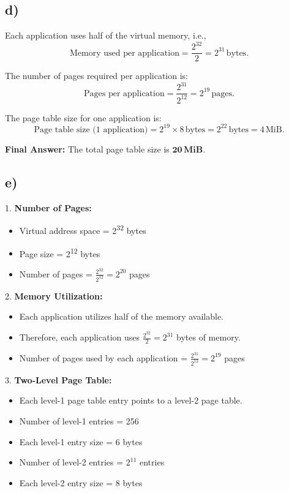 \documentclass[cn,12pt]{homework}
\begin{document}
\begin{solution}
\subsection*{d)}


Each application uses half of the virtual memory, i.e., 
\[
\text{Memory used per application} = \frac{2^{32}}{2} = 2^{31} \, \text{bytes}.
\]

The number of pages required per application is:
\[
\text{Pages per application} = \frac{2^{31}}{2^{12}} = 2^{19} \, \text{pages}.
\]

The page table size for one application is:
\[
\text{Page table size (1 application)} = 2^{19} \times 8 \, \text{bytes} = 2^{22} \, \text{bytes}=4 \, \text{MiB}.
\]

\textbf{Final Answer:} The total page table size is \(\mathbf{20 \, \text{MiB}}\).



\subsection*{e)}

1. \textbf{Number of Pages:}
   \begin{itemize}
     \item Virtual address space = 2\textsuperscript{32} bytes
     \item Page size = 2\textsuperscript{12} bytes
     \item Number of pages = \(\frac{2^{32}}{2^{12}} = 2^{20}\) pages
   \end{itemize}

2. \textbf{Memory Utilization:}
   \begin{itemize}
     \item Each application utilizes half of the memory available.
     \item Therefore, each application uses \( \frac{2^{32}}{2} = 2^{31} \) bytes of memory.
     \item Number of pages used by each application = \(\frac{2^{31}}{2^{12}} = 2^{19}\) pages
   \end{itemize}

3. \textbf{Two-Level Page Table:}
   \begin{itemize}
     \item Each level-1 page table entry points to a level-2 page table.
     \item Number of level-1 entries = 256
     \item Each level-1 entry size = 6 bytes
     \item Number of level-2 entries = \(2^{11}\) entries
     \item Each level-2 entry size = 8 bytes
   \end{itemize}


\end{solution}
\end{document}
